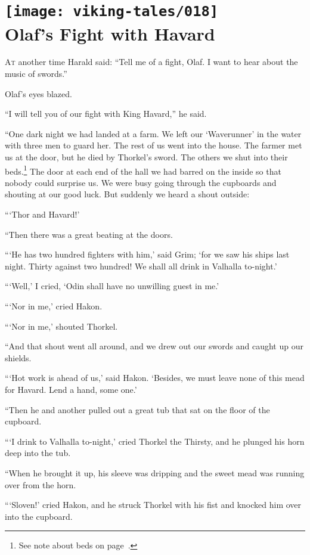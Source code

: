 \section[Olaf's Fight with Havard]{
    \texttt{[image: viking-tales/018]}\\
    Olaf's Fight with Havard}

\lettrine{A}{t} another time Harald said:
\baselineskip
``Tell me of a fight, Olaf. I want to hear about the music of swords.''

Olaf's eyes blazed.

``I will tell you of our fight with King Havard,'' he said.

``One dark night we had landed at a farm. We left our `Waverunner' in the
water with three men to guard her. The rest of us went into the house.
The farmer met us at the door, but he died by Thorkel's sword. The
others we shut into their beds.\footnote{See note about beds on
page~\pageref{beds}.} The door at each end of the hall we had barred on
the inside so that nobody could surprise us. We were busy going through
the cupboards and shouting at our good luck. But suddenly we heard a
shout outside:

```Thor and Havard!'

``Then there was a great beating at the doors.

```He has two hundred fighters with him,' said Grim; `for we saw his
ships last night. Thirty against two hundred! We shall all drink in
Valhalla to-night.'

```Well,' I cried, `Odin shall have no unwilling guest in me.'

```Nor in me,' cried Hakon.

```Nor in me,' shouted Thorkel.

``And that shout went all around, and we drew out our swords and caught
up our shields.

```Hot work is ahead of us,' said Hakon. `Besides, we must leave none of
this mead for Havard. Lend a hand, some one.'

``Then he and another pulled out a great tub that sat on the floor of the
cupboard.

```I drink to Valhalla to-night,' cried Thorkel the Thirsty, and he
plunged his horn deep into the tub.

``When he brought it up, his sleeve was dripping and the sweet mead was
running over from the horn.

```Sloven!' cried Hakon, and he struck Thorkel with his fist and knocked
him over into the cupboard.

